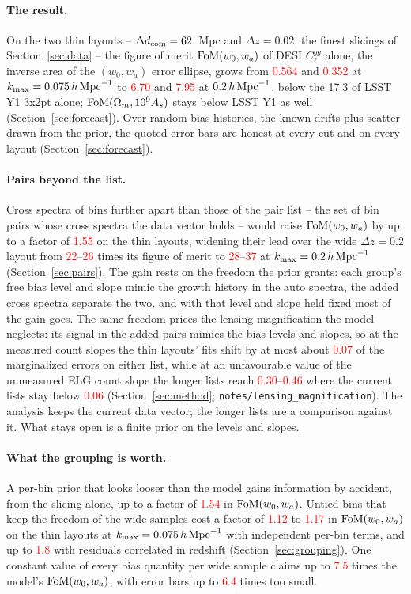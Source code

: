 \documentclass[11pt]{article}
\newcommand{\kmax}{k_{\rm max}}
\newcommand{\hMpc}{\,h\,{\rm Mpc}^{-1}}
\newif\ifnumbersfinal
\newcommand{\refresh}[1]{\ifnumbersfinal#1\else\textcolor{red}{#1}\fi}
\newcommand{\FoMwLowCom}{\refresh{0.564}}
\newcommand{\FoMwLowTwo}{\refresh{0.352}}
\newcommand{\FoMwHighCom}{\refresh{6.70}}
\newcommand{\FoMwHighTwo}{\refresh{7.95}}
\newcommand{\LSSTw}{17.3}
\newcommand{\CostNestedLowMin}{\refresh{1.12}}
\newcommand{\CostNestedLowMax}{\refresh{1.17}}
\newcommand{\CostCorrLowMax}{\refresh{1.8}}
\newcommand{\UntieGainMax}{\refresh{1.54}}
\newcommand{\ConstGainLowMax}{\refresh{7.5}}
\newcommand{\ConstEtaHighMax}{\refresh{6.4}}
\newcommand{\PairGainCom}{\refresh{1.55}}
\newcommand{\WideHighCom}{\refresh{22}}
\newcommand{\WideHighTwo}{\refresh{26}}
\newcommand{\WideHighComMax}{\refresh{28}}
\newcommand{\WideHighTwoMax}{\refresh{37}}
\newcommand{\MagFid}{\refresh{0.07}}
\newcommand{\MagPlusPairMin}{\refresh{0.30}}
\newcommand{\MagPlusPairMax}{\refresh{0.46}}
\newcommand{\MagPlusPaperMax}{\refresh{0.06}}
\begin{document}
\paragraph{The result.}
On the two thin layouts -- $\Delta d_{\rm com} = 62$~Mpc and
$\Delta z = 0.02$, the finest slicings of Section~\ref{sec:data} --
the figure of merit ${\rm FoM}(w_0, w_a)$ of DESI $C_\ell^{gg}$
alone, the inverse area of the $(w_0, w_a)$ error ellipse, grows from \FoMwLowCom{} and \FoMwLowTwo{} at
$\kmax = 0.075\hMpc$ to \FoMwHighCom{} and \FoMwHighTwo{} at $0.2\hMpc$,
below the \LSSTw{} of LSST Y1 3x2pt alone; ${\rm FoM}(\Omega_m, 10^9
A_s)$ stays below LSST Y1 as well (Section~\ref{sec:forecast}).  Over
random bias histories, the known drifts plus scatter drawn from the
prior, the quoted error bars are honest at every cut and on every
layout (Section~\ref{sec:forecast}).

\paragraph{Pairs beyond the list.}
Cross spectra of bins further apart than those of the pair list --
the set of bin pairs whose cross spectra the data vector holds --
would raise ${\rm FoM}(w_0, w_a)$ by up to a factor of \PairGainCom{}
on the thin layouts, widening their lead over the wide
$\Delta z = 0.2$ layout from \WideHighCom{}--\WideHighTwo{} times
its figure of merit to \WideHighComMax{}--\WideHighTwoMax{} at
$\kmax = 0.2\hMpc$ (Section~\ref{sec:pairs}).  The gain rests on the
freedom the prior grants: each group's free bias level and slope
mimic the growth history in the auto spectra, the added cross
spectra separate the two, and with that level and slope held fixed
most of the gain goes.  The same freedom prices the lensing
magnification the model neglects: its signal in the added pairs
mimics the bias levels and slopes, so at the measured count slopes
the thin layouts' fits shift by at most about \MagFid{} of the
marginalized errors on either list, while at an unfavourable value
of the unmeasured ELG count slope the longer lists reach
\MagPlusPairMin{}--\MagPlusPairMax{} where the current lists stay
below \MagPlusPaperMax{} (Section~\ref{sec:method};
\texttt{notes/lensing\_magnification}).  The analysis keeps the current data vector;
the longer lists are a comparison against it.  What stays open is a
finite prior on the levels and slopes.

\paragraph{What the grouping is worth.}
A per-bin prior that looks looser than the model gains information by
accident, from the slicing alone, up to a factor of \UntieGainMax{} in
${\rm FoM}(w_0, w_a)$.  Untied bins that keep the freedom of the wide
samples cost a factor of \CostNestedLowMin{} to \CostNestedLowMax{} in
${\rm FoM}(w_0, w_a)$ on the thin layouts at $\kmax = 0.075\hMpc$ with
independent per-bin terms, and up to \CostCorrLowMax{} with residuals
correlated in redshift (Section~\ref{sec:grouping}).  One constant
value of every bias quantity per wide sample claims up to
\ConstGainLowMax{} times the model's ${\rm FoM}(w_0, w_a)$, with error
bars up to \ConstEtaHighMax{} times too small.
\end{document}
